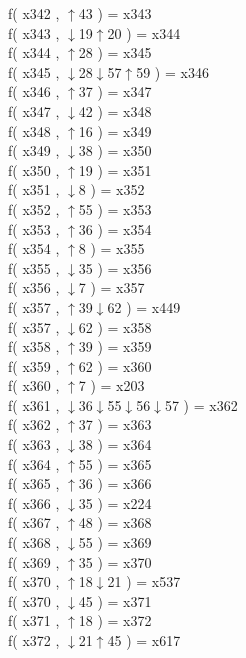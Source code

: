 f( x342 , $\uparrow$43 ) = x343 \\
f( x343 , $\downarrow$19$\uparrow$20 ) = x344 \\
f( x344 , $\uparrow$28 ) = x345 \\
f( x345 , $\downarrow$28$\downarrow$57$\uparrow$59 ) = x346 \\
f( x346 , $\uparrow$37 ) = x347 \\
f( x347 , $\downarrow$42 ) = x348 \\
f( x348 , $\uparrow$16 ) = x349 \\
f( x349 , $\downarrow$38 ) = x350 \\
f( x350 , $\uparrow$19 ) = x351 \\
f( x351 , $\downarrow$8 ) = x352 \\
f( x352 , $\uparrow$55 ) = x353 \\
f( x353 , $\uparrow$36 ) = x354 \\
f( x354 , $\uparrow$8 ) = x355 \\
f( x355 , $\downarrow$35 ) = x356 \\
f( x356 , $\downarrow$7 ) = x357 \\
f( x357 , $\uparrow$39$\downarrow$62 ) = x449 \\
f( x357 , $\downarrow$62 ) = x358 \\
f( x358 , $\uparrow$39 ) = x359 \\
f( x359 , $\uparrow$62 ) = x360 \\
f( x360 , $\uparrow$7 ) = x203 \\
f( x361 , $\downarrow$36$\downarrow$55$\downarrow$56$\downarrow$57 ) = x362 \\
f( x362 , $\uparrow$37 ) = x363 \\
f( x363 , $\downarrow$38 ) = x364 \\
f( x364 , $\uparrow$55 ) = x365 \\
f( x365 , $\uparrow$36 ) = x366 \\
f( x366 , $\downarrow$35 ) = x224 \\
f( x367 , $\uparrow$48 ) = x368 \\
f( x368 , $\downarrow$55 ) = x369 \\
f( x369 , $\uparrow$35 ) = x370 \\
f( x370 , $\uparrow$18$\downarrow$21 ) = x537 \\
f( x370 , $\downarrow$45 ) = x371 \\
f( x371 , $\uparrow$18 ) = x372 \\
f( x372 , $\downarrow$21$\uparrow$45 ) = x617 \\

